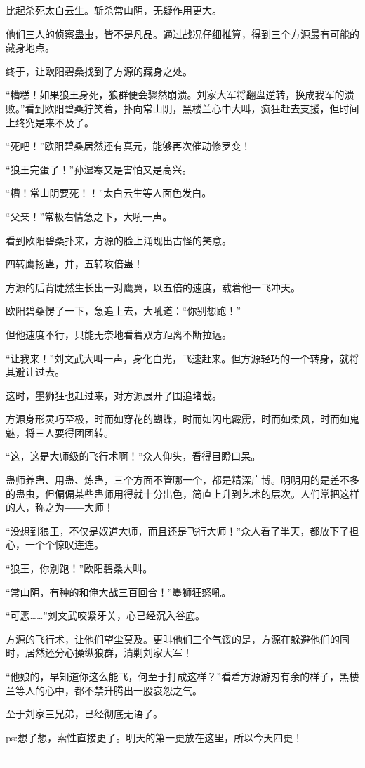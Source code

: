 \begin{this_body}
比起杀死太白云生。斩杀常山阴，无疑作用更大。

他们三人的侦察蛊虫，皆不是凡品。通过战况仔细推算，得到三个方源最有可能的藏身地点。

终于，让欧阳碧桑找到了方源的藏身之处。

“糟糕！如果狼王身死，狼群便会骤然崩溃。刘家大军将翻盘逆转，换成我军的溃败。”看到欧阳碧桑狞笑着，扑向常山阴，黑楼兰心中大叫，疯狂赶去支援，但时间上终究是来不及了。

“死吧！”欧阳碧桑居然还有真元，能够再次催动修罗变！

“狼王完蛋了！”孙湿寒又是害怕又是高兴。

“糟！常山阴要死！！”太白云生等人面色发白。

“父亲！”常极右情急之下，大吼一声。

看到欧阳碧桑扑来，方源的脸上涌现出古怪的笑意。

四转鹰扬蛊，并，五转攻倍蛊！

方源的后背陡然生长出一对鹰翼，以五倍的速度，载着他一飞冲天。

欧阳碧桑愣了一下，急追上去，大吼道：“你别想跑！”

但他速度不行，只能无奈地看着双方距离不断拉远。

“让我来！”刘文武大叫一声，身化白光，飞速赶来。但方源轻巧的一个转身，就将其避让过去。

这时，墨狮狂也赶过来，对方源展开了围追堵截。

方源身形灵巧至极，时而如穿花的蝴蝶，时而如闪电霹雳，时而如柔风，时而如鬼魅，将三人耍得团团转。

“这，这是大师级的飞行术啊！”众人仰头，看得目瞪口呆。

蛊师养蛊、用蛊、炼蛊，三个方面不管哪一个，都是精深广博。明明用的是差不多的蛊虫，但偏偏某些蛊师用得就十分出色，简直上升到艺术的层次。人们常把这样的人，称之为――大师！

“没想到狼王，不仅是奴道大师，而且还是飞行大师！”众人看了半天，都放下了担心，一个个惊叹连连。

“狼王，你别跑！”欧阳碧桑大叫。

“常山阴，有种的和俺大战三百回合！”墨狮狂怒吼。

“可恶……”刘文武咬紧牙关，心已经沉入谷底。

方源的飞行术，让他们望尘莫及。更叫他们三个气馁的是，方源在躲避他们的同时，居然还分心操纵狼群，清剿刘家大军！

“他娘的，早知道你这么能飞，何至于打成这样？”看着方源游刃有余的样子，黑楼兰等人的心中，都不禁升腾出一股哀怨之气。

至于刘家三兄弟，已经彻底无语了。

ps:想了想，索性直接更了。明天的第一更放在这里，所以今天四更！

------------

\end{this_body}

